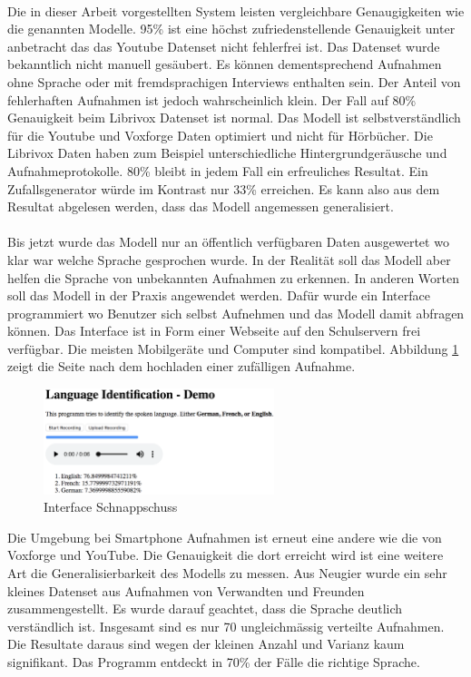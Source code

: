 \\
Die in dieser Arbeit vorgestellten System leisten vergleichbare Genaugigkeiten wie die genannten Modelle. 95\% ist eine höchst zufriedenstellende Genauigkeit unter anbetracht das das Youtube Datenset nicht fehlerfrei ist. Das Datenset wurde bekanntlich nicht manuell gesäubert. Es können dementsprechend Aufnahmen ohne Sprache oder mit fremdsprachigen Interviews enthalten sein. Der Anteil von fehlerhaften Aufnahmen ist jedoch wahrscheinlich klein. 
Der Fall auf 80\% Genauigkeit beim Librivox Datenset ist normal. Das Modell ist selbstverständlich für die Youtube und Voxforge Daten optimiert und nicht für Hörbücher. Die Librivox Daten haben zum Beispiel unterschiedliche Hintergrundgeräusche und Aufnahmeprotokolle. 80\% bleibt in jedem Fall ein erfreuliches Resultat. Ein Zufallsgenerator würde im Kontrast nur 33\% erreichen. Es kann also aus dem Resultat abgelesen werden, dass das Modell angemessen generalisiert. 
\\ \\
Bis jetzt wurde das Modell nur an öffentlich verfügbaren Daten ausgewertet wo klar war welche Sprache gesprochen wurde. In der Realität soll das Modell aber helfen die Sprache von unbekannten Aufnahmen zu erkennen. In anderen Worten soll das Modell in der Praxis angewendet werden. Dafür wurde ein Interface programmiert wo Benutzer sich selbst Aufnehmen und das Modell damit abfragen können. Das Interface ist in Form einer Webseite auf den Schulservern frei verfügbar. Die meisten Mobilgeräte und Computer sind kompatibel. Abbildung \ref{img:interface} zeigt die Seite nach dem hochladen einer zufälligen Aufnahme.
\begin{figure}[hbt]
	\centering
		\includegraphics[width=0.6\textwidth]{assets/interface.png}
	\caption{Interface Schnappschuss}
	\label{img:interface}
\end{figure}
Die Umgebung bei Smartphone Aufnahmen ist erneut eine andere wie die von Voxforge und YouTube. Die Genauigkeit die dort erreicht wird ist eine weitere Art die Generalisierbarkeit des Modells zu messen. Aus Neugier wurde ein sehr kleines Datenset aus Aufnahmen von Verwandten und Freunden zusammengestellt. Es wurde darauf geachtet, dass die Sprache deutlich verständlich ist. Insgesamt sind es nur 70 ungleichmässig verteilte Aufnahmen. Die Resultate daraus sind wegen der kleinen Anzahl und Varianz kaum signifikant. Das Programm entdeckt in 70\% der Fälle die richtige Sprache. 
